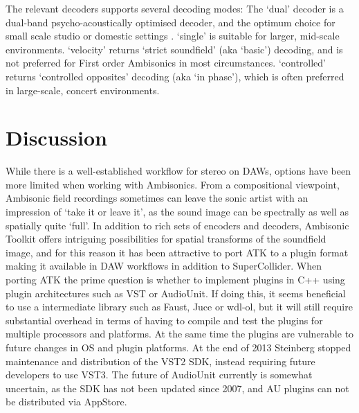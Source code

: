 \documentclass{article}
\begin{document}
The relevant decoders supports several decoding modes: 
The `dual' decoder is a dual-band psycho-acoustically optimised decoder, and the optimum choice for small scale studio or domestic settings \cite{heller:2008isAmbisonic}.
`single' is suitable for larger, mid-scale environments.
`velocity' returns `strict soundfield' (aka `basic') decoding, and is not preferred for First order Ambisonics in most circumstances.
`controlled' returns `controlled opposites' decoding (aka `in phase'), which is often preferred in large-scale, concert environments.







\section{Discussion}\label{sec:discussion}

While there is a well-established workflow for stereo on DAWs, options have been more limited when working with Ambisonics.
From a compositional viewpoint, Ambisonic field recordings sometimes can leave the sonic artist with an impression of `take it or leave it', as the sound image can be spectrally as well as spatially quite `full'.
In addition to rich sets of encoders and decoders, Ambisonic Toolkit offers intriguing possibilities for spatial transforms of the soundfield image, and for this reason it has been attractive to port ATK to a plugin format making it available in DAW workflows in addition to SuperCollider.
When porting ATK the prime question is whether to implement plugins in C++ using plugin architectures such as VST or AudioUnit.
If doing this, it seems beneficial to use a intermediate library such as Faust, Juce or wdl-ol, but it will still require substantial overhead in terms of having to compile and test the plugins for multiple processors and platforms.
At the same time the plugins are vulnerable to future changes in OS and plugin platforms.
At the end of 2013 Steinberg stopped maintenance and distribution of the VST2 SDK, instead requiring future developers to use VST3. The future of AudioUnit currently is somewhat uncertain, as the SDK has not been updated since 2007, and AU plugins can not be distributed via AppStore.
\end{document}
